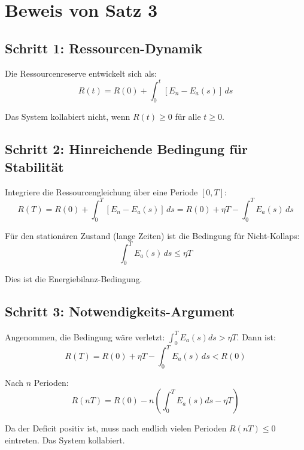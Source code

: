 \documentclass[a4paper,11pt]{report}
\theoremstyle{definition}
\begin{document}
\section{Beweis von Satz 3}

\subsection{Schritt 1: Ressourcen-Dynamik}

Die Ressourcenreserve entwickelt sich als:
\begin{equation}
    R(t) = R(0) + \int_0^t [E_n - E_a(s)] \, ds
\end{equation}

Das System kollabiert nicht, wenn $R(t) \geq 0$ für alle $t \geq 0$.

\subsection{Schritt 2: Hinreichende Bedingung für Stabilität}

Integriere die Ressourcengleichung über eine Periode $[0, T]$:
\begin{equation}
    R(T) = R(0) + \int_0^T [E_n - E_a(s)] \, ds = R(0) + \eta T - \int_0^T E_a(s) \, ds
\end{equation}

Für den stationären Zustand (lange Zeiten) ist die Bedingung für Nicht-Kollaps:
\begin{equation}
    \int_0^T E_a(s) \, ds \leq \eta T
\end{equation}

Dies ist die Energiebilanz-Bedingung.

\subsection{Schritt 3: Notwendigkeits-Argument}

Angenommen, die Bedingung wäre verletzt: $\int_0^T E_a(s) ds > \eta T$. Dann ist:
\begin{equation}
    R(T) = R(0) + \eta T - \int_0^T E_a(s) \, ds < R(0)
\end{equation}

Nach $n$ Perioden:
\begin{equation}
    R(nT) = R(0) - n \left(\int_0^T E_a(s) ds - \eta T\right)
\end{equation}

Da der Deficit positiv ist, muss nach endlich vielen Perioden $R(nT) \leq 0$ eintreten. Das System kollabiert.
\end{document}
